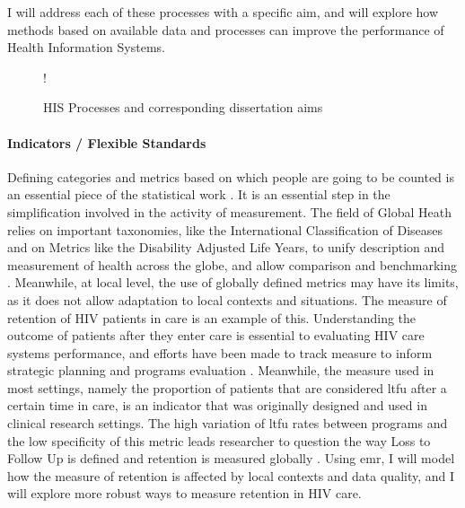 I will address each of these processes with a specific aim, and will explore how methods based on available data and processes can improve the performance of Health Information Systems.

\begin{center}
 \begin {figure}[ht]
        \centering
\resizebox{\linewidth} {!} {

}
\caption{HIS Processes and corresponding dissertation aims}
\label{fig:process_aim}
\end{figure}
\end{center}


\paragraph{Indicators / Flexible Standards} Defining categories and metrics based on which people are going to be counted is an essential piece of the statistical work \citep{desrosieres_politique_1993}. It is an essential step in the simplification involved in the activity of measurement. The field of Global Heath relies on important taxonomies, like the International Classification of Diseases and on Metrics like the Disability Adjusted Life Years, to unify description and measurement of health across the globe, and allow comparison and benchmarking \citep{murray_towards_2007,murray_health_2008}. Meanwhile, at local level, the use of globally defined metrics may have its limits, as it does not allow adaptation to local contexts and situations. The measure of retention of HIV patients in care is an example of this. Understanding the outcome of patients after they enter care is essential to evaluating HIV care systems performance, and efforts have been made to track measure to inform strategic planning and programs evaluation   \citep{the_global_fund_global_2014}. Meanwhile, the measure used in most settings, namely the proportion of patients that are considered \gls{ltfu} after a certain time in care, is an indicator that was originally designed and used in clinical research settings. The high variation of  \gls{ltfu} rates between programs and the low specificity of this metric leads researcher to question the way Loss to Follow Up is defined and retention is measured globally \citep{chi_universal_2011,yehia_comparing_2012,grimsrud_impact_2013,forster_electronic_2008}. Using \gls{emr}, I will model how the measure of retention is affected by local contexts and data quality, and I will explore  more robust ways to measure retention in HIV care.

